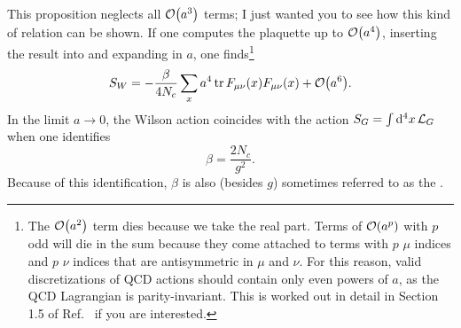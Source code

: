 This proposition neglects all $\order{a^3}$ terms; I just wanted you to see
how this kind of relation can be shown. If one computes the plaquette
up to $\order{a^4}$, inserting the result into 
and expanding in $a$, one finds\footnote{The $\order{a^2}$ term dies
because we take the real part. Terms of $\order{a^p}$ with $p$ odd will
die in the sum because they come attached to terms with $p$ $\mu$ indices
and $p$ $\nu$ indices that are antisymmetric in $\mu$ and $\nu$.
For this reason, valid discretizations of QCD actions should contain
only even powers of $a$, as the QCD Lagrangian is parity-invariant.
This is worked out in detail in Section 1.5 of Ref.~\cite{Sciarra:2016exn}
if you are interested.} 
\begin{equation}
  S_W=-\frac{\beta}{4N_c}\sum_x a^4\tr F_{\mu\nu}(x)F_{\mu\nu}(x)
                  +\order{a^6}.
\end{equation}
In the limit $a\to0$, the Wilson action coincides with the action
$S_G=\int \dd^4x\,\mathcal{L}_G$ when one identifies 
\begin{equation}
  \beta=\frac{2N_c}{g^2}.
\end{equation}
Because of this identification, $\beta$ is also (besides $g$) sometimes 
referred to as the .



